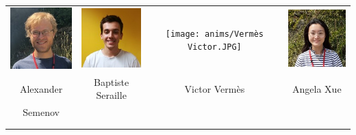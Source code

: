 \begin{center}
\begin{tabular}{cccc}
\includegraphics[angle=0,origin=c, width=27mm]{anims/Semenov Alexander.JPG} &
\includegraphics[angle=0,origin=c, width=27mm]{anims/Seraille Baptiste.jpg} &
\texttt{[image: anims/Vermès Victor.JPG]} &
\includegraphics[origin=c, width=27mm]{anims/Xue Angela.jpg} \\
Alexander & Baptiste Seraille & Victor Vermès & Angela Xue \\ Semenov & & \\ \\ \\

\end{tabular}
\end{center}